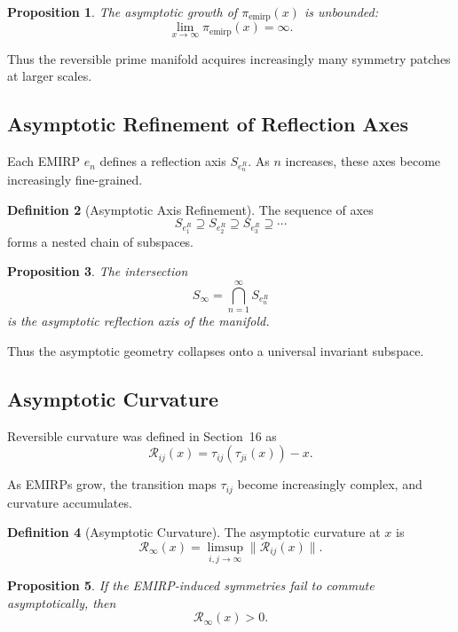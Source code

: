 \documentclass[11pt]{article}
\theoremstyle{definition}
\newtheorem{definition}{Definition}[section]
\theoremstyle{plain}
\newtheorem{proposition}[definition]{Proposition}
\theoremstyle{remark}
\begin{document}
\begin{proposition}
The asymptotic growth of $\pi_{\mathrm{emirp}}(x)$ is unbounded:
\[
\lim_{x \to \infty} \pi_{\mathrm{emirp}}(x) = \infty.
\]
\end{proposition}

Thus the reversible prime manifold acquires increasingly many symmetry
patches at larger scales.

\subsection{Asymptotic Refinement of Reflection Axes}

Each EMIRP $e_n$ defines a reflection axis $S_{e_n^R}$. As $n$ increases,
these axes become increasingly fine-grained.

\begin{definition}[Asymptotic Axis Refinement]
The sequence of axes
\[
S_{e_1^R} \supseteq S_{e_2^R} \supseteq S_{e_3^R} \supseteq \cdots
\]
forms a nested chain of subspaces.
\end{definition}

\begin{proposition}
The intersection
\[
S_\infty = \bigcap_{n=1}^\infty S_{e_n^R}
\]
is the asymptotic reflection axis of the manifold.
\end{proposition}

Thus the asymptotic geometry collapses onto a universal invariant
subspace.

\subsection{Asymptotic Curvature}

Reversible curvature was defined in Section~16 as
\[
\mathcal{R}_{ij}(x) = \tau_{ij}(\tau_{ji}(x)) - x.
\]

As EMIRPs grow, the transition maps $\tau_{ij}$ become increasingly
complex, and curvature accumulates.

\begin{definition}[Asymptotic Curvature]
The asymptotic curvature at $x$ is
\[
\mathcal{R}_\infty(x) = \limsup_{i,j \to \infty} \|\mathcal{R}_{ij}(x)\|.
\]
\end{definition}

\begin{proposition}
If the EMIRP-induced symmetries fail to commute asymptotically, then
\[
\mathcal{R}_\infty(x) > 0.
\]
\end{proposition}
\end{document}
